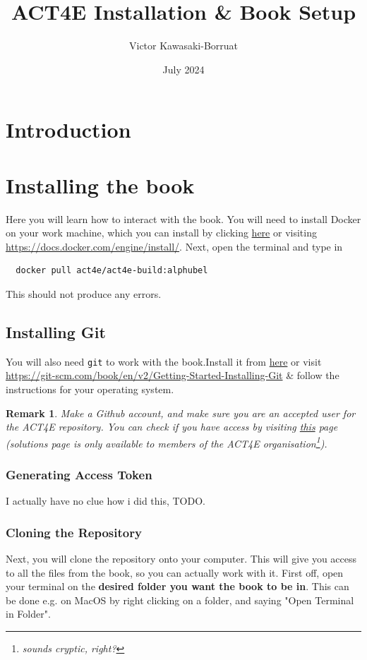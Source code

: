 \documentclass{article}
\title{ACT4E Installation \& Book Setup}
\author{Victor Kawasaki-Borruat}
\date{July 2024}
\newtheorem{remark}{Remark}
\begin{document}
\maketitle

\section{Introduction}


\section{Installing the book}
Here you will learn how to interact with the book. You will need to install Docker on your work machine, which you can install by clicking  \href{https://docs.docker.com/engine/install/}{here} or visiting \url{https://docs.docker.com/engine/install/}. Next, open the terminal and type in
\begin{verbatim}
  docker pull act4e/act4e-build:alphubel
\end{verbatim}
This should not produce any errors.


\subsection{Installing Git}
You will also need \texttt{git} to work with the book.Install it from \href{https://git-scm.com/book/en/v2/Getting-Started-Installing-Git}{here} or visit \url{https://git-scm.com/book/en/v2/Getting-Started-Installing-Git} \& follow the instructions for your operating system.

\begin{remark}
    Make a Github account, and make sure you are an accepted user for the ACT4E repository. You can check if you have access by visiting \href{https://github.com/ACT4E/ACT4E-solutions}{this} page (solutions page is only available to members of the ACT4E organisation\footnote{sounds cryptic, right?}).
\end{remark}

\subsubsection{Generating Access Token}
I actually have no clue how i did this, TODO.

\subsubsection{Cloning the Repository}
Next, you will clone the repository onto your computer. This will give you access to all the files from the book, so you can actually work with it. First off, open your terminal on the \textbf{desired folder you want the book to be in}. This can be done e.g. on MacOS by right clicking on a folder, and saying "Open Terminal in Folder". 
\end{document}
